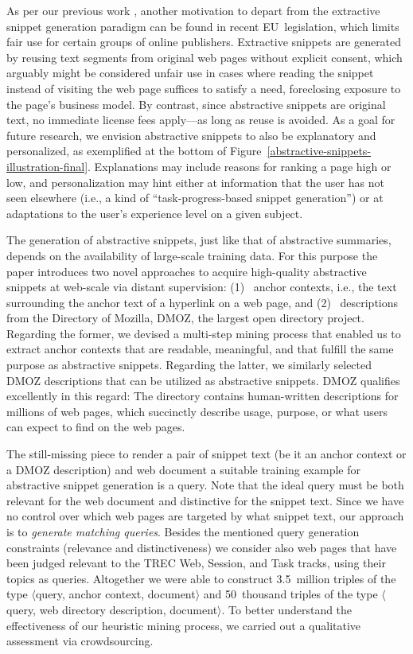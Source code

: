 \documentclass[sigconf]{acmart}
\newcommand{\Ni}{(1)~}
\newcommand{\Nii}{(2)~}
\begin{document}
As per our previous work \cite{stein:2018b}, another motivation to depart from the extractive snippet generation paradigm can be found in recent EU~legislation, which limits fair use for certain groups of online publishers. Extractive snippets are generated by reusing text segments from original web pages without explicit consent, which arguably might be considered unfair use in cases where reading the snippet instead of visiting the web page suffices to satisfy a need, foreclosing exposure to the page's business model. By contrast, since abstractive snippets are original text, no immediate license fees apply---as long as reuse is avoided. As a goal for future research, we envision abstractive snippets to also be explanatory and personalized, as exemplified at the bottom of Figure~\ref{abstractive-snippets-illustration-final}. Explanations may include reasons for ranking a page high or low, and personalization may hint either at information that the user has not seen elsewhere (i.e., a kind of ``task-progress-based snippet generation'') or at adaptations to the user's experience level on a given subject. 

The generation of abstractive snippets, just like that of abstractive summaries, depends on the availability of large-scale training data. For this purpose the paper introduces two novel approaches to acquire high-quality abstractive snippets at web-scale via distant supervision:
\Ni
anchor contexts, i.e., the text surrounding the anchor text of a hyperlink on a web page, and
\Nii
descriptions from the Directory of Mozilla, DMOZ, the largest open directory project.
Regarding the former, we devised a multi-step mining process that enabled us to extract anchor contexts that are readable, meaningful, and that fulfill the same purpose as abstractive snippets. Regarding the latter, we similarly selected DMOZ descriptions that can be utilized as abstractive snippets. DMOZ qualifies excellently in this regard: The directory contains human-written descriptions for millions of web pages, which succinctly describe usage, purpose, or what users can expect to find on the web pages.

The still-missing piece to render a pair of snippet text (be it an anchor context or a DMOZ description) and web document a suitable training example for abstractive snippet generation is a query. Note that the ideal query must be both relevant for the web document and distinctive for the snippet text. Since we have no control over which web pages are targeted by what snippet text, our approach is to {\em generate matching queries}. Besides the mentioned query generation constraints (relevance and distinctiveness) we consider also web pages that have been judged relevant to the TREC Web, Session, and Task tracks, using their topics as queries. Altogether we were able to construct 3.5~million triples of the type $\langle$query, anchor context, document$\rangle$ and 50~thousand triples of the type $\langle$query, web directory description, document$\rangle$. To better understand the effectiveness of our heuristic mining process, we carried out a qualitative assessment via crowdsourcing.
\end{document}
